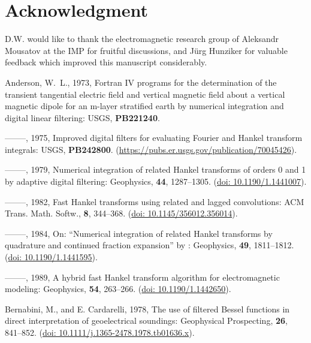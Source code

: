 \documentclass[paper,twocolumn,twoside]{geophysics}
\begin{document}
\section{Acknowledgment}

D.W. would like to thank the electromagnetic research group of Aleksandr
Mousatov at the IMP for fruitful discussions, and Jürg Hunziker for valuable
feedback which improved this manuscript considerably.

\begin{thebibliography}{}
\itemsep0pt

Anderson, W.~L.,  1973, Fortran {IV} programs for the determination of the
  transient tangential electric field and vertical magnetic field about a
  vertical magnetic dipole for an m-layer stratified earth by numerical
  integration and digital linear filtering: USGS, {\bf PB221240}.

--------, 1975, Improved digital filters for evaluating {F}ourier and {H}ankel
  transform integrals: USGS, {\bf PB242800}.
\newblock
  (\href{https://pubs.er.usgs.gov/publication/70045426}{https://pubs.er.usgs.gov/publication/70045426}).

--------, 1979, Numerical integration of related {H}ankel transforms of orders
  0 and 1 by adaptive digital filtering: Geophysics, {\bf 44}, 1287--1305.
\newblock (\href{http://doi.org/10.1190/1.1441007}{doi: 10.1190/1.1441007}).

--------, 1982, Fast {H}ankel transforms using related and lagged convolutions:
  ACM Trans. Math. Softw., {\bf 8}, 344--368.
\newblock (\href{http://doi.acm.org/10.1145/356012.356014}{doi:
  10.1145/356012.356014}).

--------, 1984, {On: “Numerical integration of related Hankel transforms by
  quadrature and continued fraction expansion” by \cite{GEO.83.Chave}}:
  Geophysics, {\bf 49}, 1811--1812.
\newblock (\href{http://doi.org/10.1190/1.1441595}{doi: 10.1190/1.1441595}).

--------, 1989, A hybrid fast {H}ankel transform algorithm for electromagnetic
  modeling: Geophysics, {\bf 54}, 263--266.
\newblock (\href{http://doi.org/10.1190/1.1442650}{doi: 10.1190/1.1442650}).

Bernabini, M., and E. Cardarelli,  1978, The use of filtered {B}essel functions
  in direct interpretation of geoelectrical soundings: Geophysical Prospecting,
  {\bf 26}, 841--852.
\newblock (\href{http://doi.org/10.1111/j.1365-2478.1978.tb01636.x}{doi:
  10.1111/j.1365-2478.1978.tb01636.x}).


\end{thebibliography}
\end{document}
